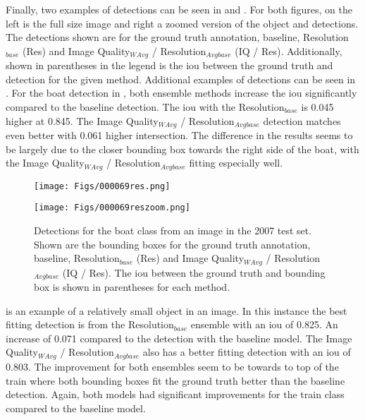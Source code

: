 \documentclass[a4paper,twoside]{article}
\begin{document}
Finally, two examples of detections can be seen in  and . For both figures, on the left is the full size image and right a zoomed version of the object and detections. The detections shown are for the ground truth annotation, baseline, Resolution$_{base}$ (Res) and Image Quality$_{WAvg}$ / Resolution$_{Avgbase}$ (IQ / Res). Additionally, shown in parentheses in the legend is the \gls{iou} between the ground truth and detection for the given method. Additional examples of detections can be seen in .
For the boat detection in , both ensemble methods increase the \gls{iou} significantly compared to the baseline detection. The \gls{iou} with the Resolution$_{base}$ is 0.045 higher at 0.845. The Image Quality$_{WAvg}$ / Resolution$_{Avgbase}$ detection matches even better with 0.061 higher intersection. The difference in the results seems to be largely due to the closer bounding box towards the right side of the boat, with the Image Quality$_{WAvg}$ / Resolution$_{Avgbase}$ fitting especially well.


\begin{figure*}[!h]
  \texttt{[image: Figs/000069res.png]}
  \caption*{}\label{fig:}
\endminipage\hfill
{}
  \texttt{[image: Figs/000069reszoom.png]}
  \caption*{}\label{fig:}
\endminipage\hfill
\caption{Detections for the boat class from an image in the 2007 test set. Shown are the bounding boxes for the ground truth annotation, baseline, Resolution$_{base}$ (Res) and Image Quality$_{WAvg}$ / Resolution$_{Avgbase}$ (IQ / Res). The \gls{iou} between the ground truth and bounding box is shown in parentheses for each method.}
\label{fig:boatres}
\end{figure*}

 is an example of a relatively small object in an image. In this instance the best fitting detection is from the Resolution$_{base}$ ensemble with an \gls{iou} of 0.825. An increase of 0.071 compared to the detection with the baseline model. The Image Quality$_{WAvg}$ / Resolution$_{Avgbase}$ also has a better fitting detection with an \gls{iou} of 0.803. The improvement for both ensembles seem to be towards to top of the train  where both bounding boxes fit the ground truth better than the baseline detection.
Again, both models had significant improvements for the train class compared to the baseline model.
\end{document}
